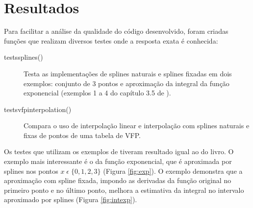 \documentclass[final,5p]{elsarticle}
\numberwithin{equation}{section}
\begin{document}
    \section{Resultados}
    
        Para facilitar a análise da qualidade do código desenvolvido, foram criadas funções que realizam diversos testes onde a resposta exata é conhecida:

        \begin{description}
            \item[tests\textunderscore splines()] Testa as implementações de splines naturais e splines fixadas em dois exemplos: conjunto de 3 pontos e aproximação da integral da função exponencial (exemplos 1 a 4 do capítulo 3.5 de \cite{burden2016analise}).
            
            \item[tests\textunderscore vfp\textunderscore interpolation()] Compara o uso de interpolação linear e interpolação com splines naturais e fixas de pontos de uma tabela de VFP.
        \end{description}

        Os testes que utilizam os exemplos de \cite{burden2016analise} tiveram resultado igual ao do livro. O exemplo mais interessante é o da função exponencial, que é aproximada por splines nos pontos $x \; \epsilon \; \{0,1, 2, 3\}$ (Figura \ref{fig:exp}). O exemplo demonstra que a aproximação com spline fixada, impondo as derivadas da função original no primeiro ponto e no último ponto, melhora a estimativa da integral no intervalo aproximado por splines (Figura \ref{fig:intexp}).
        
\end{document}
